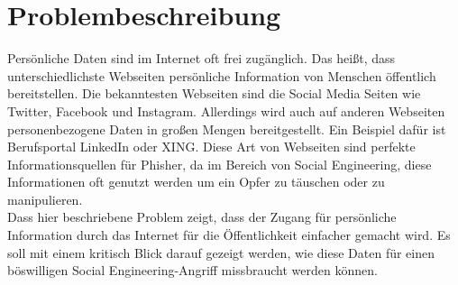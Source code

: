 

\chapter{Problembeschreibung}  %
\label{cha:Problemspezifikation} %
Persönliche Daten sind im Internet oft frei zugänglich. Das heißt, dass unterschiedlichste Webseiten persönliche Information von Menschen öffentlich bereitstellen. Die bekanntesten Webseiten sind die Social Media Seiten wie Twitter, Facebook und Instagram. Allerdings wird auch auf anderen Webseiten personenbezogene Daten in großen Mengen bereitgestellt. Ein Beispiel dafür ist Berufsportal LinkedIn oder XING. Diese Art von Webseiten sind perfekte Informationsquellen für Phisher, da im Bereich von Social Engineering, diese Informationen oft genutzt werden um ein Opfer zu täuschen oder zu manipulieren.\\
Dass hier beschriebene Problem zeigt, dass der Zugang für persönliche Information durch das Internet für die Öffentlichkeit einfacher gemacht wird. Es soll mit einem kritisch Blick darauf gezeigt werden, wie diese Daten für einen böswilligen Social Engineering-Angriff missbraucht werden können.
